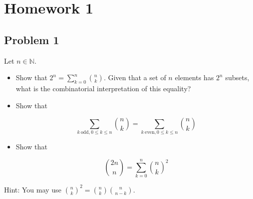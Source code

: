 \chapter{Homework 1}\label{homework-1}

\section{Problem 1}\label{hw01-problem-1}

Let \(\mathit{n} \in \mathbb{N}\).

\begin{itemize}
\item
  Show that \(2^{\mathit{n}} = \sum_{\mathit{k} = 0}^{\mathit{n}}\binom{\mathit{n}}{\mathit{k}}\). Given that a set of \(\mathit{n}\) elements has \(2^{\mathit{n}}\) subsets, what is the combinatorial interpretation of this equality?
\item
  Show that

  \[\sum\limits_{\mathit{k}\ \text{odd},0 \leq \mathit{k} \leq \mathit{n}}\binom{\mathit{n}}{\mathit{k}} = \sum\limits_{\mathit{k}\ \text{even},0 \leq \mathit{k} \leq \mathit{n}}\binom{\mathit{n}}{\mathit{k}}\]
\item
  Show that

  \[\binom{2\mathit{n}}{\mathit{n}} = \sum\limits_{\mathit{k} = 0}^{\mathit{n}}\binom{\mathit{n}}{\mathit{k}}^{2}\]
\end{itemize}

Hint: You may use \(\binom{\mathit{n}}{\mathit{k}}^{2} = \binom{\mathit{n}}{\mathit{k}}\binom{\mathit{n}}{\mathit{n} - \mathit{k}}\).


